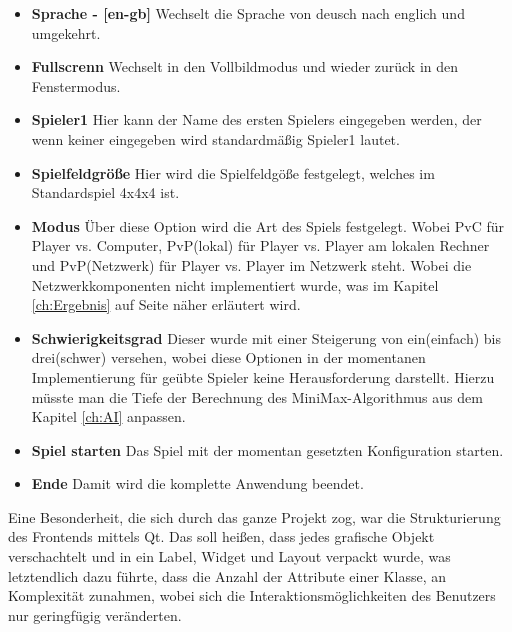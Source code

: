 \documentclass[a4paper]{scrartcl}
\begin{document}
\begin{itemize}
	\item \textbf{Sprache - [en-gb]} Wechselt die Sprache von deusch nach englich und umgekehrt.
	\item \textbf{Fullscrenn} Wechselt in den Vollbildmodus und wieder zurück in den Fenstermodus.
	\item \textbf{Spieler1} Hier kann der Name des ersten Spielers eingegeben werden, der wenn keiner eingegeben wird standardmäßig Spieler1 lautet.
	\item \textbf{Spielfeldgröße} Hier wird die Spielfeldgöße festgelegt, welches im Standardspiel 4x4x4 ist.
	\item \textbf{Modus} Über diese Option wird die Art des Spiels festgelegt. Wobei PvC für Player vs. Computer, PvP(lokal) für Player vs. Player am lokalen Rechner und PvP(Netzwerk) für Player vs. Player im Netzwerk steht. Wobei die Netzwerkkomponenten nicht implementiert wurde, was im Kapitel \ref{ch:Ergebnis} auf Seite \pageref{ch:Ergebnis} näher erläutert wird.
	\item \textbf{\glqq Schwierigkeitsgrad\grqq} Dieser wurde mit einer Steigerung von ein(einfach) bis drei(schwer) versehen, wobei diese Optionen in der momentanen Implementierung für geübte Spieler keine Herausforderung darstellt. Hierzu müsste man die Tiefe der Berechnung des MiniMax-Algorithmus aus dem Kapitel \ref{ch:AI} anpassen.
	\item \textbf{Spiel starten} Das Spiel mit der momentan gesetzten Konfiguration starten.
	\item \textbf{Ende} Damit wird die komplette Anwendung beendet.
\end{itemize}

Eine Besonderheit, die sich durch das ganze Projekt zog, war die Strukturierung des Frontends mittels Qt. Das soll heißen, dass jedes grafische Objekt verschachtelt und in ein Label, Widget und Layout verpackt wurde, was letztendlich dazu führte, dass die Anzahl der Attribute einer Klasse, an Komplexität zunahmen, wobei sich die Interaktionsmöglichkeiten des Benutzers nur geringfügig veränderten.
 
\end{document}
